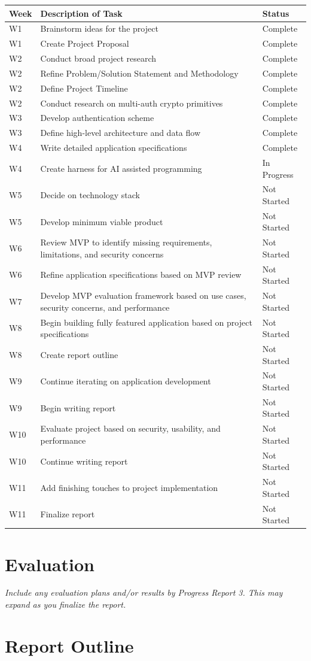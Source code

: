 \documentclass[12pt]{article}
\newcommand{\tlrow}[3]{#1 & #2 & #3 \\}
\newcommand{\instruction}[1]{{\small\itshape #1}}
\begin{document}
\vspace{0.5em}
\begin{tabularx}{\linewidth}{@{} l X l @{}}
  \toprule
  \textbf{Week} & \textbf{Description of Task} & \textbf{Status} \\
  \midrule
  \tlrow{W1}  {Brainstorm ideas for the project} {Complete}
  \tlrow{W1}  {Create Project Proposal} {Complete}
  \tlrow{W2}  {Conduct broad project research} {Complete}
  \tlrow{W2}  {Refine Problem/Solution Statement and Methodology} {Complete}
  \tlrow{W2}  {Define Project Timeline} {Complete}
  \tlrow{W2}  {Conduct research on multi-auth crypto primitives} {Complete}
  \tlrow{W3}  {Develop authentication scheme} {Complete}
  \tlrow{W3}  {Define high-level architecture and data flow} {Complete}
  \tlrow{W4}  {Write detailed application specifications} {Complete}
  \tlrow{W4}  {Create harness for AI assisted programming} {In Progress}
  \tlrow{W5}  {Decide on technology stack} {Not Started}
  \tlrow{W5}  {Develop minimum viable product} {Not Started}
  \tlrow{W6}  {Review MVP to identify missing requirements, limitations, and security concerns} {Not Started}
  \tlrow{W6}  {Refine application specifications based on MVP review} {Not Started}
  \tlrow{W7}  {Develop MVP evaluation framework based on use cases, security concerns, and performance} {Not Started}
  \tlrow{W8}  {Begin building fully featured application based on project specifications} {Not Started}
  \tlrow{W8}  {Create report outline} {Not Started}
  \tlrow{W9}  {Continue iterating on application development} {Not Started}
  \tlrow{W9}  {Begin writing report} {Not Started}
  \tlrow{W10} {Evaluate project based on security, usability, and performance} {Not Started}
  \tlrow{W10} {Continue writing report} {Not Started}
  \tlrow{W11} {Add finishing touches to project implementation} {Not Started}
  \tlrow{W11} {Finalize report} {Not Started}
  \bottomrule
\end{tabularx}

\section*{Evaluation}

\instruction{Include any evaluation plans and/or results by Progress Report 3. This may expand as you finalize the report.}

\section*{Report Outline}
\end{document}
